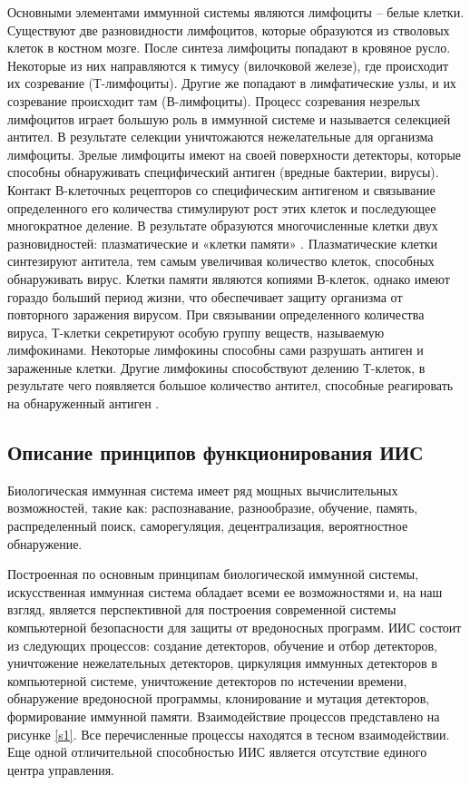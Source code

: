 \documentclass[bachelor, och, referat]{template}
\begin{document}
Основными элементами иммунной системы являются лимфоциты – белые клетки.
Существуют две разновидности лимфоцитов, которые образуются из стволовых клеток в
костном мозге. После синтеза лимфоциты попадают в кровяное русло. Некоторые из них
направляются к тимусу (вилочковой железе), где происходит их созревание (Т-лимфоциты). 
Другие же попадают в лимфатические узлы, и их созревание происходит
там (В-лимфоциты). Процесс созревания незрелых лимфоцитов играет большую роль в
иммунной системе и называется селекцией антител. В результате селекции уничтожаются 
нежелательные для организма лимфоциты. Зрелые лимфоциты имеют на своей поверхности 
детекторы, которые способны обнаруживать специфический антиген (вредные
бактерии, вирусы). Контакт В-клеточных рецепторов со специфическим антигеном и 
связывание определенного его количества стимулируют рост этих клеток и последующее 
многократное деление. В результате образуются многочисленные клетки двух разновидностей:
плазматические и «клетки памяти» \cite{ais3}. Плазматические клетки синтезируют антитела, тем самым 
увеличивая количество клеток, способных обнаруживать вирус. Клетки памяти являются 
копиями В-клеток, однако имеют гораздо больший период жизни, что обеспечивает
защиту организма от повторного заражения вирусом. При связывании определенного
количества вируса, Т-клетки секретируют особую группу веществ, называемую лимфокинами. 
Некоторые лимфокины способны сами разрушать антиген и зараженные клетки.
Другие лимфокины способствуют делению Т-клеток, в результате чего появляется
большое количество антител, способные реагировать на обнаруженный антиген \cite{ais4}.

\subsection{Описание принципов функционирования ИИС}

Биологическая иммунная система имеет ряд мощных вычислительных возможностей, 
такие как: распознавание, разнообразие, обучение, память, распределенный поиск,
саморегуляция, децентрализация, вероятностное обнаружение.

Построенная по основным принципам биологической иммунной системы, 
искусственная иммунная система обладает всеми ее возможностями
и, на наш взгляд, является перспективной для построения современной
системы компьютерной безопасности для защиты от вредоносных про­грамм. 
ИИС состоит из следующих процессов: создание детекторов, обу­чение и отбор 
детекторов, уничтожение нежелательных детекторов, цир­куляция 
иммунных детекторов в компьютерной системе, уничтожение
детекторов по истечении времени, обнаружение вредоносной программы,
клонирование и мутация детекторов, формирование иммунной памяти. 
Взаимодействие процессов представлено на рисунке \ref{s1}. Все 
перечислен­ные процессы находятся в тесном взаимодействии. Еще одной 
отличи­тельной способностью ИИС является отсутствие единого центра 
управле­ния.
\end{document}
